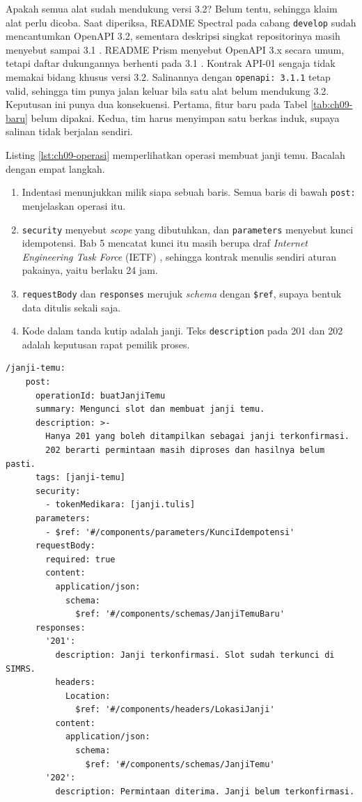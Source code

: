 Apakah semua alat sudah mendukung versi 3.2? Belum tentu, sehingga klaim alat perlu dicoba. Saat diperiksa, README Spectral pada cabang \texttt{develop} sudah mencantumkan OpenAPI 3.2, sementara deskripsi singkat repositorinya
masih menyebut sampai 3.1 \cite{spectral}. README Prism menyebut OpenAPI 3.x secara umum, tetapi daftar dukungannya berhenti pada 3.1 \cite{c09-prism}. Kontrak API-01 sengaja tidak memakai bidang khusus versi 3.2. Salinannya dengan \texttt{openapi: 3.1.1} tetap valid, sehingga tim
punya jalan keluar bila satu alat belum mendukung 3.2. Keputusan ini punya dua konsekuensi. Pertama, fitur baru pada Tabel \ref{tab:ch09-baru} belum dipakai. Kedua, tim harus menyimpan satu berkas induk, supaya salinan tidak berjalan sendiri.

\begin{pendalaman}[title={Pendalaman Teknis (opsional): Membaca Kontrak YAML Baris demi Baris}]
Listing \ref{lst:ch09-operasi} memperlihatkan operasi membuat janji temu. Bacalah dengan empat langkah.
\begin{enumerate}
  \item Indentasi menunjukkan milik siapa sebuah baris. Semua baris di bawah \texttt{post:} menjelaskan operasi itu.
  \item \texttt{security} menyebut \textit{scope} yang dibutuhkan, dan \texttt{parameters} menyebut kunci idempotensi. Bab 5 mencatat kunci itu masih berupa draf \textit{Internet Engineering Task Force} (IETF) \cite{idempotency-key-draft}, sehingga kontrak menulis sendiri aturan
        pakainya, yaitu berlaku 24 jam.
  \item \texttt{requestBody} dan \texttt{responses} merujuk \textit{schema} dengan \texttt{\$ref}, supaya bentuk data ditulis sekali saja.
  \item Kode dalam tanda kutip adalah janji. Teks \texttt{description} pada 201 dan 202 adalah keputusan rapat pemilik proses.
\end{enumerate}

\begin{lstlisting}[style=ch09yaml, caption={Operasi membuat janji temu, tersedia di \berkas{sources/chapter09/kontrak-api-01-janji-temu.yaml}}, label={lst:ch09-operasi}]
  /janji-temu:
    post:
      operationId: buatJanjiTemu
      summary: Mengunci slot dan membuat janji temu.
      description: >-
        Hanya 201 yang boleh ditampilkan sebagai janji terkonfirmasi.
        202 berarti permintaan masih diproses dan hasilnya belum pasti.
      tags: [janji-temu]
      security:
        - tokenMedikara: [janji.tulis]
      parameters:
        - $ref: '#/components/parameters/KunciIdempotensi'
      requestBody:
        required: true
        content:
          application/json:
            schema:
              $ref: '#/components/schemas/JanjiTemuBaru'
      responses:
        '201':
          description: Janji terkonfirmasi. Slot sudah terkunci di SIMRS.
          headers:
            Location:
              $ref: '#/components/headers/LokasiJanji'
          content:
            application/json:
              schema:
                $ref: '#/components/schemas/JanjiTemu'
        '202':
          description: Permintaan diterima. Janji belum terkonfirmasi.
\end{lstlisting}


\end{pendalaman}
